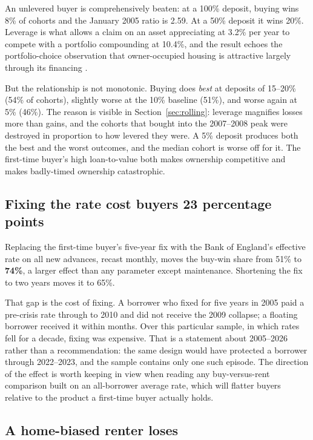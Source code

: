 An unlevered buyer is comprehensively beaten: at a 100\% deposit, buying wins 8\% of cohorts and the January 2005 ratio is 2.59. At a 50\% deposit it wins 20\%. Leverage is what allows a claim on an asset appreciating at 3.2\% per year to compete with a portfolio compounding at 10.4\%, and the result echoes the portfolio-choice observation that owner-occupied housing is attractive largely through its financing \parencite{flavin2002}.

But the relationship is not monotonic. Buying does \emph{best} at deposits of 15--20\% (54\% of cohorts), slightly worse at the 10\% baseline (51\%), and worse again at 5\% (46\%). The reason is visible in Section~\ref{sec:rolling}: leverage magnifies losses more than gains, and the cohorts that bought into the 2007--2008 peak were destroyed in proportion to how levered they were. A 5\% deposit produces both the best and the worst outcomes, and the median cohort is worse off for it. The first-time buyer's high loan-to-value both makes ownership competitive and makes badly-timed ownership catastrophic.

\subsection{Fixing the rate cost buyers 23 percentage points}

Replacing the first-time buyer's five-year fix with the Bank of England's effective rate on all new advances, recast monthly, moves the buy-win share from 51\% to \textbf{74\%}, a larger effect than any parameter except maintenance. Shortening the fix to two years moves it to 65\%.

That gap is the cost of fixing. A borrower who fixed for five years in 2005 paid a pre-crisis rate through to 2010 and did not receive the 2009 collapse; a floating borrower received it within months. Over this particular sample, in which rates fell for a decade, fixing was expensive. That is a statement about 2005--2026 rather than a recommendation: the same design would have protected a borrower through 2022--2023, and the sample contains only one such episode. The direction of the effect is worth keeping in view when reading any buy-versus-rent comparison built on an all-borrower average rate, which will flatter buyers relative to the product a first-time buyer actually holds.

\subsection{A home-biased renter loses}

